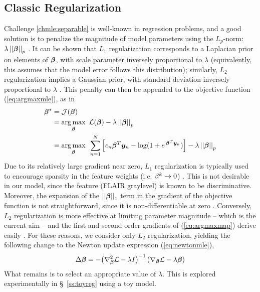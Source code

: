 \subsection{Classic Regularization}
Challenge \ref{chmle:separable} is well-known in regression problems, and a good solution is to penalize the magnitude of model parameters using the $L_p$-norm: $\lambda\left|\left|\bm{\beta}\right|\right|_p$ \cite{Zou2005}. It can be shown that $L_1$ regularization corresponds to a Laplacian prior on elements of $\bm{\beta}$, with scale parameter inversely proportional to $\lambda$ (equivalently, this assumes that the model error follows this distribution); similarly, $L_2$ regularization implies a Gaussian prior, with standard deviation inversely proportional to $\lambda$ \cite{Zou2005}. This penalty can then be appended to the objective function (\ref{eq:argmaxmle}), as in 
\begin{align}
\bm{\beta}^* &= \mathcal{J}(\bm{\beta})\nonumber\\
&= \underset{\bm{\beta}}{\arg\max}\enspace\mathcal{L}(\bm{\beta}) - \lambda\left|\left|\bm{\beta}\right|\right|_p \nonumber\\
&= \underset{\bm{\beta}}{\arg\max}\enspace\sum_{n=1}^{N} \Big[ c_n \bm{\beta}^T\bm{y}_n - \log (1+e^{\thinspace\bm{\beta}^T\bm{y}_n}) \Big] - \lambda\left|\left|\bm{\beta}\right|\right|_p
\label{eq:argmaxmap}
\end{align}
Due to its relatively large gradient near zero, $L_1$ regularization is typically used to encourage sparsity in the feature weights (i.e. $\beta^k\rightarrow0$) \cite{Tibshirani1996}. This is not desirable in our model, since the feature (FLAIR graylevel) is known to be discriminative. Moreover, the expansion of the $\left|\left|\bm{\beta}\right|\right|_1$ term in the gradient of the objective function is not straightforward, since it is non-differentiable at zero \cite{Tibshirani1996,Lee2006}. Conversely, $L_2$ regularization is more effective at limiting parameter magnitude -- which is the current aim -- and the first and second order gradients of (\ref{eq:argmaxmap}) derive easily \cite{Minka2003}. For these reasons, we consider only $L_2$ regularization, yielding the following change to the Newton update expression (\ref{eq:newtonmle}),
\begin{equation}
\Delta\bm{\beta} = -{\left(\nabla^2_{\bm{\beta}}\mathcal{L}-\lambda I\right)}^{-1}\left(\nabla_{\bm{\beta}}\mathcal{L}-\lambda\bm{\beta}\right)
\label{eq:newtonmap}
\end{equation}
What remains is to select an appropriate value of $\lambda$. This is explored experimentally in \S\ \ref{ss:toyreg} using a toy model.
